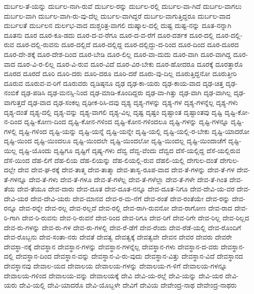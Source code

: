 {ದುರ್ಬಲ-ತೆ-ಯನ್ನು
ದುರ್ಬಲ-ನಾಗಿ-ರುವೆ
ದುರ್ಬಲ-ರನ್ನು
ದುರ್ಬಲ-ರಲ್ಲಿ
ದುರ್ಬಲ-ವಾ-ಗಿದೆ
ದುರ್ಬಲ-ವಾಗಲು
ದುರ್ಬಲ-ವಾಗಿ
ದುರ್ಬಲ-ವಾಗಿ-ರು-ವು-ದೆಲ್ಲ
ದುರ್ಬಲ-ವಾಗಿದ್ದರೆ
ದುರ್ಬಲ-ವಾಗುತ್ತಿದ್ದರೂ
ದುರ್ಬಲ-ವಾದ
ದುರ್ಬಲತೆ
ದುರ್ಬಲನ
ದುರ್ಲಭ-ವಾದ
ದುಶ್ಚರಿತ್ರ-ವಾಗಲಿ
ದುಷ್ಕಾಲ-ದಲ್ಲಿ
ದುಷ್ಟ
ದುಷ್ಟ-ನನ್ನು
ದೂತ-ನನ್ನಾಗಿ
ದೂತನು
ದೂರ
ದೂರ-ಕೂ-ಡದು
ದೂರ-ದ-ವ-ರೆಗೂ
ದೂರ-ದ-ವ-ರೆಗೆ
ದೂರ-ದರ್ಶಕ
ದೂರ-ದಲ್ಲಿ
ದೂರ-ದಲ್ಲಿ-ರುವ
ದೂರ-ದಲ್ಲಿ-ರುವನು
ದೂರ-ದಲ್ಲಿದೆ
ದೂರ-ದಲ್ಲಿದ್ದ
ದೂರ-ದಲ್ಲಿದ್ದು-ದ-ರಿಂದ
ದೂರ-ದಿಂದ
ದೂರ-ದೂರದ
ದೂರ-ದೇ-ಶಕ್ಕೆ
ದೂರ-ದೇಶ-ದಿಂದ
ದೂರ-ಬೇಡಿ
ದೂರ-ಲಿಲ್ಲ
ದೂರ-ವಾ-ದುದು
ದೂರ-ವಾಗಿ
ದೂರ-ವಾಗಿದ್ದ
ದೂರ-ವಾದ
ದೂರ-ವಿ-ರ-ಲಿಲ್ಲ
ದೂರ-ವಿ-ರುವ
ದೂರ-ವಿದೆ
ದೂರ-ವಿರ-ಬೇಕು
ದೂರ-ಹೋದರೂ
ದೂರಕ್ಕೆ
ದೂರತ್ತಾರೊ
ದೂರದ
ದೂರದೆ
ದೂರಿ
ದೂರಿ-ದರು
ದೂರಿ-ದರೂ
ದೂರಿ-ದರೆ
ದೂರು-ವು-ದಿಲ್ಲ
ದೂರುತ್ತಿದ್ದನೋ
ದೂರುತ್ತೀರಿ
ದೂರುವ
ದೂರುವ-ವ-ರಿಗೆ
ದೂರುವರು
ದೃಡಿಷ್ಠನೂ
ದೃಢ
ದೃಢ-ಕಾ-ಯರು
ದೃಢ-ಕಾಯ-ವಾದ
ದೃಢ-ಚಿತ್ತ
ದೃಢ-ನಂಬಿಕೆ
ದೃಢ-ಪಡಿಸಿ
ದೃಢ-ಮನಸ್ಸಿ-ನಿಂದ
ದೃಢ-ಮಾಡಿ-ಕೊಂದಿದ್ದರು
ದೃಢ-ವಾ-ಗಿತ್ತು
ದೃಢ-ವಾಗಿ
ದೃಢ-ವಾಗಿಲ್ಲ
ದೃಢ-ವಾಗುತ್ತದೆ
ದೃಢ-ವಾದ
ದೃಢ-ಸಂಕಲ್ಪ
ದೃಢೀಕ-ರಿಸಿ-ದವು
ದೃಶ್ಯ
ದೃಶ್ಯ-ಗಳನ್ನು
ದೃಶ್ಯ-ಗಳ
ದೃಶ್ಯ-ಗಳನ್ನೆಲ್ಲ
ದೃಶ್ಯ-ಗಳು
ದೃಶ್ಯ-ದಂತೆ
ದೃಶ್ಯ-ದಲ್ಲಿ
ದೃಶ್ಯ-ವನ್ನು
ದೃಶ್ಯ-ವಾಗಲಿ
ದೃಶ್ಯ-ವಿಲ್ಲ
ದೃಷ್ಟ
ದೃಷ್ಟಂ
ದೃಷ್ಟಾಂತ
ದೃಷ್ಟಾಂತವು
ದೃಷ್ಟಿ
ದೃಷ್ಟಿ-ಕೋ-ನ-ದಿಂದ
ದೃಷ್ಟಿ-ಕೋಣ-ದಿಂದ
ದೃಷ್ಟಿ-ಕೋನ-ಗಳಿಂದ
ದೃಷ್ಟಿ-ಕೋನ-ಗಳಿಂದಲೂ
ದೃಷ್ಟಿ-ಗಳನ್ನು
ದೃಷ್ಟಿ-ಗಳನ್ನೂ
ದೃಷ್ಟಿ-ಗಳಲ್ಲಿ
ದೃಷ್ಟಿ-ಗಳಿಂದ
ದೃಷ್ಟಿ-ಯನ್ನು
ದೃಷ್ಟಿ-ಯನ್ನೆ
ದೃಷ್ಟಿ-ಯನ್ನೇ
ದೃಷ್ಟಿ-ಯಲ್ಲಿ
ದೃಷ್ಟಿ-ಯಲ್ಲಿ-ರ-ಬೇಕು
ದೃಷ್ಟಿ-ಯಾದರೋ
ದೃಷ್ಟಿ-ಯಿಂದ
ದೃಷ್ಟಿ-ಯಿಂದಲೂ
ದೃಷ್ಟಿ-ಯಿಂದಲೇ
ದೃಷ್ಟಿ-ಯಿಂದಲೋ
ದೃಷ್ಟಿ-ಯಿಂದಲ್ಲ
ದೃಷ್ಟಿ-ಯಿಂದಾಚೆಗೆ
ದೃಷ್ಟಿ-ಯಿಲ್ಲ
ದೃಷ್ಟಿ-ಯೊಂದು
ದೃಷ್ಟಿಗೂ
ದೃಷ್ಟಿಗೆ
ದೃಷ್ಯ-ಗಳು
ದೆವ್ವ
ದೆವ್ವ-ವೆಂದು
ದೆವ್ವದ
ದೆಸೆ-ಯಲ್ಲಿದ್ದ
ದೆಸೆ-ಯಲ್ಲಿರುವ
ದೆಸೆ-ಯಿಂದ
ದೆಹ-ಲಿಗೆ
ದೆಹ-ಲಿಯ
ದೆಹ-ಲಿಯನ್ನು
ದೆಹ-ಲಿಯಲ್ಲಿ-ರುವ
ದೆಹಲಿ-ಯಲ್ಲಿ
ದೇಗುಲ-ದಂತೆ
ದೇಗುಲ-ದಲ್ಲೇ
ದೇವ
ದೇವ-ಘ-ರಕ್ಕೆ
ದೇವ-ತಾತ್ಮ
ದೇವ-ತಾತ್ಮಾ
ದೇವ-ತಾಸ್ವ-ರೂಪ-ವಾದ
ದೇವ-ತೆ-ಗಳನ್ನು
ದೇವ-ತೆ-ಗಳ
ದೇವ-ತೆ-ಗಳನ್ನೂ
ದೇವ-ತೆ-ಗಳು
ದೇವ-ತೆ-ಗಳೂ
ದೇವ-ತೆ-ಗಳೆಲ್ಲ
ದೇವ-ತೆ-ಗಳೆಲ್ಲಾ
ದೇವ-ತೆ-ಗಳೇ
ದೇವ-ತೆ-ಗಿಂತ
ದೇವ-ತೆಯ
ದೇವ-ತೆಯೂ
ದೇವ-ದಾರು
ದೇವ-ದೂತ
ದೇವ-ದೂತ-ನನ್ನೂ
ದೇವ-ದೂತ-ನಿಗೂ
ದೇವ-ದೇವಿ-ಯ-ವರ
ದೇವ-ದೇವಿ-ಯರ
ದೇವ-ದೇವಿ-ಯರು
ದೇವ-ಮಾನವ
ದೇವ-ರ-ಮ-ನೆಗೆ
ದೇವ-ರಂತೆ
ದೇವ-ರಂತೆಯೇ
ದೇವ-ರನ್ನು
ದೇವ-ರನ್ನೂ
ದೇವ-ರನ್ನೇ
ದೇವ-ರಲ್ಲ
ದೇವ-ರಲ್ಲದೆ
ದೇವ-ರಲ್ಲಿ
ದೇವ-ರಾಗಿ-ರುವನೋ
ದೇವ-ರಾಗೋಣ
ದೇವ-ರಾದ
ದೇವ-ರಿ-ಗಾಗಿ
ದೇವ-ರಿ-ರುವನು
ದೇವ-ರಿ-ರುವನೆ
ದೇವ-ರಿಂದ
ದೇವ-ರಿಗೂ
ದೇವ-ರಿಗೆ
ದೇವ-ರಿಗೇ
ದೇವ-ರಿಲ್ಲ
ದೇವ-ರಿಲ್ಲದ
ದೇವ-ರು-ಗಳನ್ನು
ದೇವ-ರು-ಗಳ
ದೇವ-ರು-ಗಳಲ್ಲಿ
ದೇವ-ರೆ-ಡೆಗೆ
ದೇವ-ರೆಂದು
ದೇವ-ರೆಡೆ-ಯಲ್ಲಿ
ದೇವ-ರೊಂದಿಗೆ
ದೇವ-ರೊಬ್ಬನು
ದೇವ-ಸಂತಾ-ನರು
ದೇವತೆ
ದೇವತ್ವ
ದೇವತ್ವಕ್ಕೆ
ದೇವತ್ವವೇ
ದೇವನ
ದೇವರ
ದೇವರು
ದೇವರೇ
ದೇವಸ್ಥಾ-ನಕ್ಕೆ
ದೇವಸ್ಥಾನ
ದೇವಸ್ಥಾನ-ಗಳನ್ನು
ದೇವಸ್ಥಾನ-ಗಳನ್ನೆಲ್ಲ
ದೇವಸ್ಥಾನ-ಗಳು
ದೇವಸ್ಥಾನ-ದ-ವರು
ದೇವಸ್ಥಾನ-ದಲ್ಲಿ
ದೇವಸ್ಥಾನ-ದಿಂದ
ದೇವಸ್ಥಾನ-ವನ್ನು
ದೇವಸ್ಥಾನ-ವಿ-ರು-ವುದು
ದೇವಸ್ಥಾನ-ವಿತ್ತು
ದೇವಸ್ಥಾನ-ವಿದೆ
ದೇವಸ್ಥಾನದ
ದೇವಸ್ಥಾನವು
ದೇವಾಲ-ಯದ
ದೇವಾಲಯ
ದೇವಾಲಯ-ಗಳನ್ನು
ದೇವಾಲಯ-ಗ-ಳಿಗೆ
ದೇವಾಲಯ-ಗಳನ್ನೂ
ದೇವಾಲಯ-ಗಳಿಂದ
ದೇವಾಲಯ-ವನ್ನು
ದೇವಾಲಯಕ್ಕೆ
ದೇವಿ
ದೇವಿ-ಯ-ರಲ್ಲೆ
ದೇವಿ-ಯನ್ನು
ದೇವಿ-ಯರ
ದೇವಿ-ಯರು
ದೇವಿ-ಯಲ್ಲಿ
ದೇವಿ-ಯಾದರೊ
ದೇವಿ-ಯೊಬ್ಬಳೇ
ದೇವಿಗೆ
ದೇವಿಯ
ದೇವೇಂದ್ರ-ನಾಥ
ದೇವೇಂದ್ರ-ನಾಥರು
}
